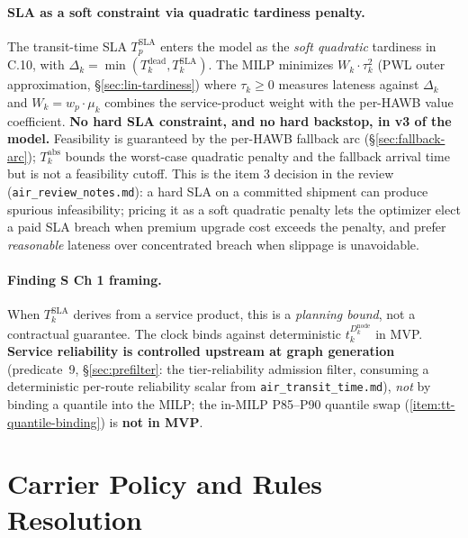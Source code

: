 \documentclass[11pt,a4paper]{article}
\theoremstyle{definition}
\begin{document}
\paragraph{SLA as a soft constraint via quadratic tardiness penalty.}
The transit-time SLA $T^{\text{SLA}}_p$ enters the model as the \emph{soft
quadratic} tardiness in C.10, with $\Delta_k = \min(T_k^{\text{dead}},
T_k^{\text{SLA}})$. The MILP minimizes $W_k \cdot \tau_k^2$ (PWL outer
approximation, \S\ref{sec:lin-tardiness}) where $\tau_k \geq 0$ measures
lateness against $\Delta_k$ and $W_k = w_p \cdot \mu_k$ combines the
service-product weight with the per-HAWB value coefficient.
\textbf{No hard SLA constraint, and no hard backstop, in v3 of the model.}
Feasibility is guaranteed by the per-HAWB fallback arc
(\S\ref{sec:fallback-arc}); $T_k^{\text{abs}}$ bounds the worst-case
quadratic penalty and the fallback arrival time but is not a feasibility
cutoff. This is the item 3 decision in the review
(\texttt{air\_review\_notes.md}): a hard SLA on a committed shipment can
produce spurious infeasibility; pricing it as a soft quadratic penalty lets
the optimizer elect a paid SLA breach when premium upgrade cost exceeds the
penalty, and prefer \emph{reasonable} lateness over concentrated breach when
slippage is unavoidable.

\paragraph{Finding S Ch 1 framing.}
When $T_k^{\text{SLA}}$ derives from a service product, this is a
\emph{planning bound}, not a contractual guarantee. The clock binds against
deterministic $t_k^{D_k^{\text{node}}}$ in MVP. \textbf{Service reliability is
controlled upstream at graph generation} (predicate~9, \S\ref{sec:prefilter}:
the tier-reliability admission filter, consuming a deterministic per-route
reliability scalar from \texttt{air\_transit\_time.md}), \emph{not} by binding a
quantile into the MILP; the in-MILP P85--P90 quantile swap
(\ref{item:tt-quantile-binding}) is \textbf{not in MVP}.

\section{Carrier Policy and Rules Resolution}
\label{sec:carrier-policy}
\end{document}
